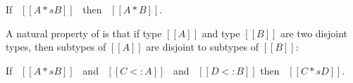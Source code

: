 \begin{lemma}
  If \ $[[A *s B]]$ \ then \ $[[A * B]]$.
\label{lemma:union:disj-complete}
\end{lemma}

\begin{comment}
\begin{proof}
  By induction on type A.
  \begin{itemize}
    \item Case $[[Top]]$ requires \Cref{lemma:union:bl-disj}.
    \item Case $[[Bot]]$ is trivial to prove.
    \item Case $[[Int]]$ requires induction on type B and
          \Cref{lemma:union:bl-disj,lemma:union:disj-sym}.
    \item Case $[[A -> B]]$ requires induction on type B and \Cref{lemma:union:disj-sym}.
    \item Case $[[A \/ B]]$ follows directly from inductive hypothesis.
  \end{itemize}
\end{proof}
\end{comment}


\begin{comment}
\begin{lemma}[Bottom-Like Disjoint]
  If \ $[[botlike A]]$ \ then \ $[[A * B]]$.
\label{lemma:union:bl-disjoint}
\end{lemma}
\end{comment}

\noindent A natural property of \cal is
that if type $[[A]]$ and type $[[B]]$ are two disjoint types, then subtypes
of $[[A]]$ are disjoint to subtypes of $[[B]]$:

\begin{lemma}
  If \ $[[A *s B]]$ \ and \ $[[C <: A]]$ \ and \ $[[D <: B]]$  then \ $[[C *s D]]$.
\label{lemma:union:disj-sub}
\end{lemma}




